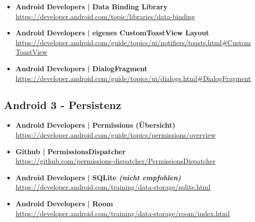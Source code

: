 \documentclass[a4paper]{article}
\begin{document}
{\begin{itemize}
		\item \textbf{Android Developers | Data Binding Library}\\
		\href{https://developer.android.com/topic/libraries/data-binding}
		{https://developer.android.com/topic/libraries/data-binding}
		
		\item \textbf{Android Developers | eigenes CustomToastView Layout}\\
		\href{https://developer.android.com/guide/topics/ui/notifiers/toasts.html#CustomToastView}
		{https://developer.android.com/guide/topics/ui/notifiers/toasts.html\#CustomToastView}
		
		\item \textbf{Android Developers | DialogFragment}\\
		\href{https://developer.android.com/guide/topics/ui/dialogs.html#DialogFragment}
		{https://developer.android.com/guide/topics/ui/dialogs.html\#DialogFragment}
		
		
	\end{itemize}
	
	\subsection{Android 3 - Persistenz}
	
	\begin{itemize}
		\item \textbf{Android Developers | Permissions (Übersicht)}\\
		\href{https://developer.android.com/guide/topics/permissions/overview}
		{https://developer.android.com/guide/topics/permissions/overview}
		
		\item \textbf{Github | PermissionsDispatcher}\\
		\href{https://github.com/permissions-dispatcher/PermissionsDispatcher}
		{https://github.com/permissions-dispatcher/PermissionsDispatcher}
		
		\item \textbf{Android Developers | SQLite \textit{(nicht empfohlen)}}\\
		\href{https://developer.android.com/training/data-storage/sqlite.html}
		{https://developer.android.com/training/data-storage/sqlite.html}
		
		\item \textbf{Android Developers | Room}\\
		\href{https://developer.android.com/training/data-storage/room/index.html}
		{https://developer.android.com/training/data-storage/room/index.html}
		

\end{itemize}}
\end{document}
